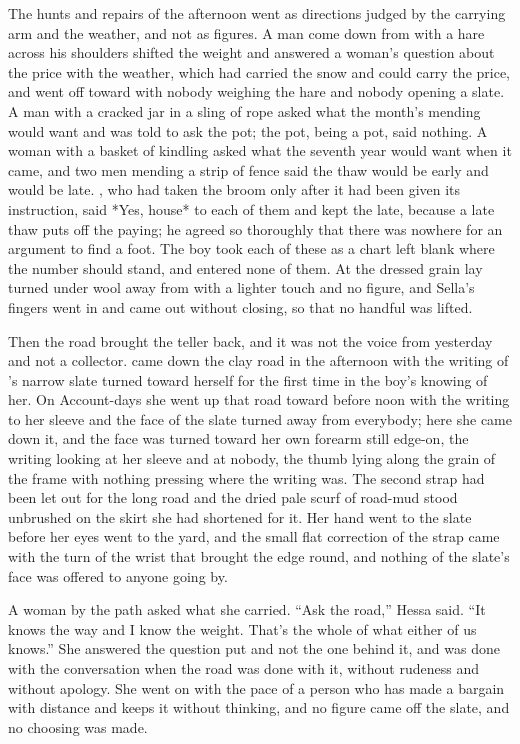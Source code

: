 The hunts and repairs of the afternoon went as directions judged by the carrying arm and the weather, and not as figures. A man come down from  with a hare across his shoulders shifted the weight and answered a woman's question about the price with the weather, which had carried the snow and could carry the price, and went off toward  with nobody weighing the hare and nobody opening a slate. A man with a cracked jar in a sling of rope asked what the month's mending would want and was told to ask the pot; the pot, being a pot, said nothing. A woman with a basket of kindling asked what the seventh year would want when it came, and two men mending a strip of fence said the thaw would be early and would be late. , who had taken the broom only after it had been given its instruction, said *Yes, house* to each of them and kept the late, because a late thaw puts off the paying; he agreed so thoroughly that there was nowhere for an argument to find a foot. The boy took each of these as a chart left blank where the number should stand, and entered none of them. At  the dressed grain lay turned under wool away from  with a lighter touch and no figure, and Sella's fingers went in and came out without closing, so that no handful was lifted.

\scenebreak

Then the road brought the teller back, and it was not the voice from yesterday and not a collector.  came down the clay road in the afternoon with the writing of 's narrow slate turned toward herself for the first time in the boy's knowing of her. On Account-days she went up that road toward  before noon with the writing to her sleeve and the face of the slate turned away from everybody; here she came down it, and the face was turned toward her own forearm still edge-on, the writing looking at her sleeve and at nobody, the thumb lying along the grain of the frame with nothing pressing where the writing was. The second strap had been let out for the long road and the dried pale scurf of road-mud stood unbrushed on the skirt she had shortened for it. Her hand went to the slate before her eyes went to the yard, and the small flat correction of the strap came with the turn of the wrist that brought the edge round, and nothing of the slate's face was offered to anyone going by.

A woman by the path asked what she carried. “Ask the road,” Hessa said. “It knows the way and I know the weight. That's the whole of what either of us knows.” She answered the question put and not the one behind it, and was done with the conversation when the road was done with it, without rudeness and without apology. She went on with the pace of a person who has made a bargain with distance and keeps it without thinking, and no figure came off the slate, and no choosing was made.

